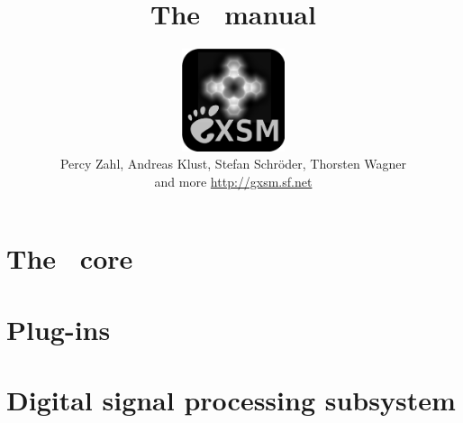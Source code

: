 \documentclass[twoside,headsepline,bibliography=totoc,index=totoc,pdftex]{scrbook}
\title{The \Gxsm\ manual}
\author{
  \includegraphics[width=3cm]{images/Gxsm-3.0-icon.pdf}\\[5mm]
  Percy Zahl, Andreas Klust, Stefan Schr\"oder, Thorsten Wagner\\
  and more \url{http://gxsm.sf.net}
}
\begin{document}
\nocite{Zahl03RSI74_1222}	
\nocite{Zahl10JVSTB28_C4E39}
\nocite{Zahl15IM17_38}

\maketitle



\tableofcontents

%
%


%
%



%
%
\part{The \Gxsm\ core}







%

%
%
\part{Plug-ins}







%
%
\part{Digital signal processing subsystem}



%
%
%
\end{document}
